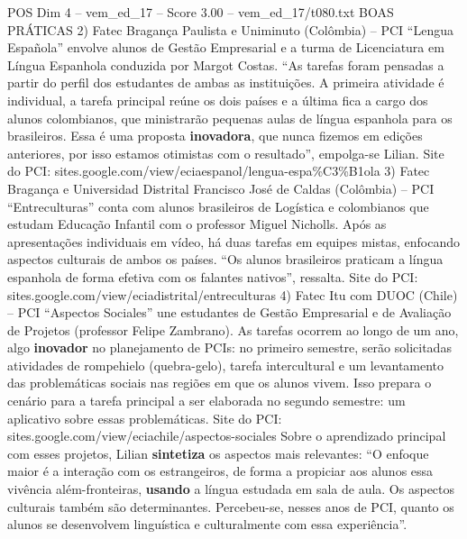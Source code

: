 \begin{textsample}{POS Dim 4 – vem\_ed\_17 – Score 3.00 – vem\_ed\_17/t080.txt}  \label{ex:f4_pos_085}
BOAS PRÁTICAS 2) Fatec Bragança Paulista e Uniminuto (Colômbia) – PCI “Lengua Española” envolve alunos de Gestão Empresarial e a turma de Licenciatura em Língua Espanhola conduzida por Margot Costas. “As tarefas foram pensadas a partir do perfil dos estudantes de ambas as instituições.
A primeira atividade é individual, a tarefa principal reúne os dois países e a última fica a cargo dos alunos colombianos, que ministrarão pequenas aulas de língua espanhola para os brasileiros.
Essa é uma proposta \textbf{inovadora}, que nunca fizemos em edições anteriores, por isso estamos otimistas com o resultado”, empolga-se Lilian.
Site do PCI: sites.google.com/view/eciaespanol/lengua-espa\%C3\%B1ola 3) Fatec Bragança e Universidad Distrital Francisco José de Caldas (Colômbia) – PCI “Entreculturas” conta com alunos brasileiros de Logística e colombianos que estudam Educação Infantil com o professor Miguel Nicholls.
Após as apresentações individuais em vídeo, há duas tarefas em equipes mistas, enfocando aspectos culturais de ambos os países. “Os alunos brasileiros praticam a língua espanhola de forma efetiva com os falantes nativos”, ressalta.
Site do PCI: sites.google.com/view/eciadistrital/entreculturas 4) Fatec Itu com DUOC (Chile) – PCI “Aspectos Sociales” une estudantes de Gestão Empresarial e de Avaliação de Projetos (professor Felipe Zambrano).
As tarefas ocorrem ao longo de um ano, algo \textbf{inovador} no planejamento de PCIs: no primeiro semestre, serão solicitadas atividades de rompehielo (quebra-gelo), tarefa intercultural e um levantamento das problemáticas sociais nas regiões em que os alunos vivem.
Isso prepara o cenário para a tarefa principal a ser elaborada no segundo semestre: um aplicativo sobre essas problemáticas.
Site do PCI: sites.google.com/view/eciachile/aspectos-sociales Sobre o aprendizado principal com esses projetos, Lilian \textbf{sintetiza} os aspectos mais relevantes: “O enfoque maior é a interação com os estrangeiros, de forma a propiciar aos alunos essa vivência além-fronteiras, \textbf{usando} a língua estudada em sala de aula.
Os aspectos culturais também são determinantes.
Percebeu-se, nesses anos de PCI, quanto os alunos se desenvolvem linguística e culturalmente com essa experiência”.

\end{textsample}
